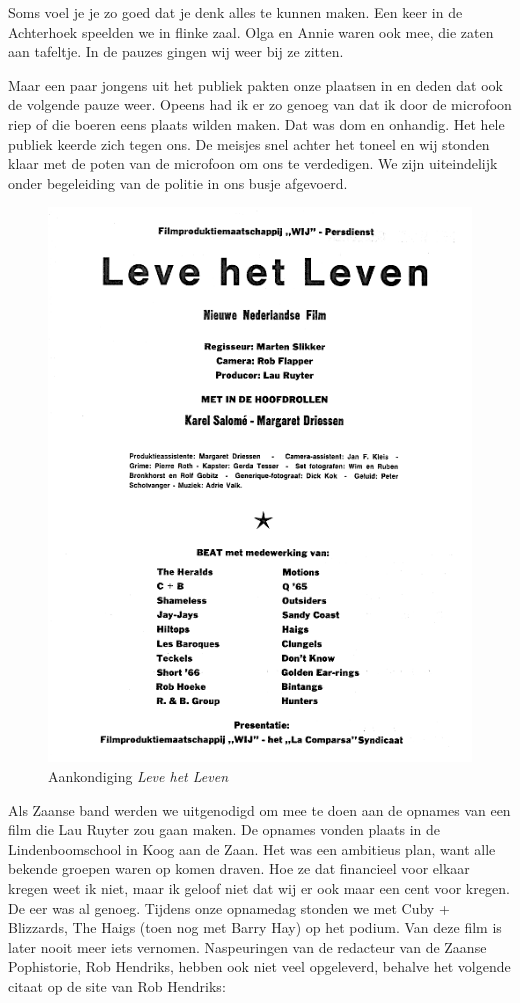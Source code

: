 \documentclass[12pt,twoside, openright]{memoir}
\begin{document}
Soms voel je je zo goed dat je denk alles te kunnen maken. Een keer in de Achterhoek speelden we in flinke zaal. Olga en Annie waren ook mee, die zaten aan tafeltje. In de pauzes gingen wij weer bij ze zitten. 

Maar een paar jongens uit het publiek pakten onze plaatsen in en deden dat ook de volgende pauze weer. Opeens had ik er zo genoeg van dat ik door de microfoon riep of die boeren eens plaats wilden maken. Dat was dom en onhandig. Het hele publiek keerde zich tegen ons. De meisjes snel achter het toneel en wij stonden klaar met de poten van de microfoon om ons te verdedigen. We zijn uiteindelijk onder begeleiding van de politie in ons busje afgevoerd.

\begin{figure}
\includegraphics[width=\textwidth]{img/ch30/film}
\caption*{\footnotesize Aankondiging \emph{Leve het Leven}}
\end{figure}

Als Zaanse band werden we uitgenodigd om mee te doen aan de opnames van een film die Lau Ruyter zou gaan maken. De opnames vonden plaats in de Lindenboomschool in Koog aan de Zaan. Het was een ambitieus plan, want alle bekende groepen waren op komen draven. Hoe ze dat financieel voor elkaar kregen weet ik niet, maar ik geloof niet dat wij er ook maar een cent voor kregen. De eer was al genoeg. Tijdens onze opnamedag stonden we met Cuby + Blizzards, The Haigs (toen nog met Barry Hay) op het podium. Van deze film is later nooit meer iets vernomen. Naspeuringen van de redacteur van de Zaanse Pophistorie, Rob Hendriks, hebben ook niet veel opgeleverd, behalve het volgende citaat op de site van Rob Hendriks: 
\end{document}
